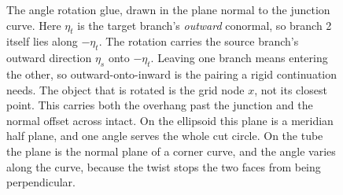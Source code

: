 \begin{figure}[htbp]
\caption{The angle rotation glue, drawn in the plane normal to the
  junction curve. Here $\eta_t$ is the target branch's \emph{outward}
  conormal, so branch 2 itself lies along $-\eta_t$. The rotation carries
  the source branch's outward direction $\eta_s$ onto $-\eta_t$. Leaving
  one branch means entering the other, so outward-onto-inward is the
  pairing a rigid continuation needs. The object that is rotated is the
  grid node $x$, not its closest point. This carries both the overhang
  past the junction and the normal offset across intact. On the ellipsoid
  this plane is a meridian half plane, and one angle serves the whole cut
  circle. On the tube the plane is the normal plane of a corner curve,
  and the angle varies along the curve, because the twist stops the two
  faces from being perpendicular.}
\label{fig:glue}
\end{figure}
